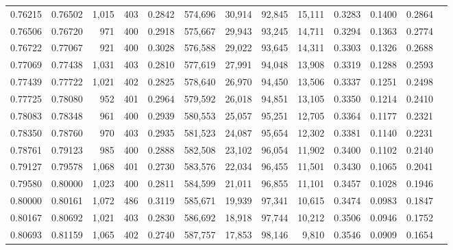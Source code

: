 \begin{tabular}{rrrrrrrrrrrrr}
0.76215 & 0.76502 &  1,015 &   403 &                                     0.2842 & 574,696 &  30,914 &  92,845 &  15,111 & 0.3283 & 0.1400 & 0.2864 \\
0.76506 & 0.76720 &    971 &   400 &                                     0.2918 & 575,667 &  29,943 &  93,245 &  14,711 & 0.3294 & 0.1363 & 0.2774 \\
0.76722 & 0.77067 &    921 &   400 &                                     0.3028 & 576,588 &  29,022 &  93,645 &  14,311 & 0.3303 & 0.1326 & 0.2688 \\
0.77069 & 0.77438 &  1,031 &   403 &                                     0.2810 & 577,619 &  27,991 &  94,048 &  13,908 & 0.3319 & 0.1288 & 0.2593 \\
0.77439 & 0.77722 &  1,021 &   402 &                                     0.2825 & 578,640 &  26,970 &  94,450 &  13,506 & 0.3337 & 0.1251 & 0.2498 \\
0.77725 & 0.78080 &    952 &   401 &                                     0.2964 & 579,592 &  26,018 &  94,851 &  13,105 & 0.3350 & 0.1214 & 0.2410 \\
0.78083 & 0.78348 &    961 &   400 &                                     0.2939 & 580,553 &  25,057 &  95,251 &  12,705 & 0.3364 & 0.1177 & 0.2321 \\
0.78350 & 0.78760 &    970 &   403 &                                     0.2935 & 581,523 &  24,087 &  95,654 &  12,302 & 0.3381 & 0.1140 & 0.2231 \\
0.78761 & 0.79123 &    985 &   400 &                                     0.2888 & 582,508 &  23,102 &  96,054 &  11,902 & 0.3400 & 0.1102 & 0.2140 \\
0.79127 & 0.79578 &  1,068 &   401 &                                     0.2730 & 583,576 &  22,034 &  96,455 &  11,501 & 0.3430 & 0.1065 & 0.2041 \\
0.79580 & 0.80000 &  1,023 &   400 &                                     0.2811 & 584,599 &  21,011 &  96,855 &  11,101 & 0.3457 & 0.1028 & 0.1946 \\
0.80000 & 0.80161 &  1,072 &   486 &                                     0.3119 & 585,671 &  19,939 &  97,341 &  10,615 & 0.3474 & 0.0983 & 0.1847 \\
0.80167 & 0.80692 &  1,021 &   403 &                                     0.2830 & 586,692 &  18,918 &  97,744 &  10,212 & 0.3506 & 0.0946 & 0.1752 \\
0.80693 & 0.81159 &  1,065 &   402 &                                     0.2740 & 587,757 &  17,853 &  98,146 &   9,810 & 0.3546 & 0.0909 & 0.1654 \\

\end{tabular}
